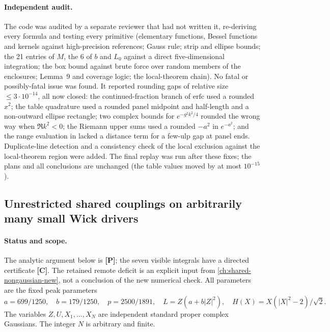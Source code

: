 \paragraph{Independent audit.} The code was audited by a separate reviewer that had not written it, re-deriving every formula and
testing every primitive (elementary functions, Bessel functions and kernels against high-precision references; Gauss rule; strip and
ellipse bounds; the 21 entries of $M$, the 6 of $b$ and $L_0$ against a direct five-dimensional integration; the box bound against
brute force over random members of the enclosures; Lemma~9 and coverage logic; the local-theorem chain). No fatal or possibly-fatal
issue was found. It reported rounding gaps of relative size $\le3\cdot10^{-14}$, all now closed: the continued-fraction branch of
$\mathrm{erfc}$ used a rounded $x^2$; the table quadrature used a rounded panel midpoint and half-length and a non-outward ellipse rectangle;
two complex bounds for $e^{-g^2k^2/4}$ rounded the wrong way when $\Re k^2<0$; the Riemann upper sums used a rounded $-a^2$ in $e^{-a^2}$; and
the range evaluation in  lacked a distance term for a few-ulp gap at panel ends. Duplicate-line detection and a
consistency check of the local exclusion against the local-theorem region were added. The final replay was run after these fixes;
the plans and all conclusions are unchanged (the table values moved by at most $10^{-15}$).


\subsection{Unrestricted shared couplings on arbitrarily many small Wick drivers}
\label{sec:buffered-review-anyn}
\paragraph{Status and scope.}
The analytic argument below is \textbf{[P]}; the seven visible integrals
have a directed certificate \textbf{[C]}.  The retained remote deficit
is an explicit input from \autoref{ch:shared-nongaussian-new},
not a conclusion of the new numerical check.
All parameters are the fixed peak parameters
\[
 a=699/1250,\quad b=179/1250,\quad p=2500/1891,\quad
 L=Z(a+b|Z|^2),\quad H(X)=X(|X|^2-2)/\sqrt2.
\]
The variables \(Z,U,X_1,\ldots,X_N\) are independent standard proper
complex Gaussians.  The integer \(N\) is arbitrary and finite.

